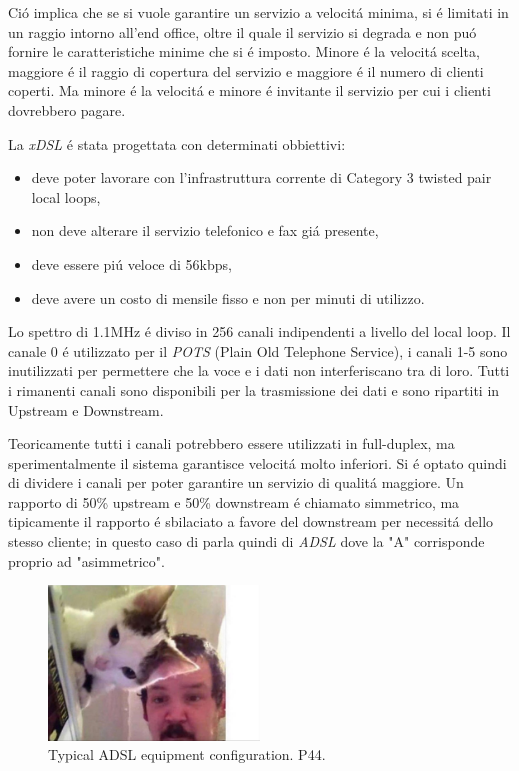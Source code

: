 \documentclass[../ComputerNetworks.tex]{subfiles}
\begin{document}
Ció implica che se si vuole garantire un servizio a velocitá minima, si é limitati in un raggio intorno all’end office, oltre il quale il servizio si degrada e non puó fornire le caratteristiche minime che si é imposto.
Minore é la velocitá scelta, maggiore é il raggio di copertura del servizio e maggiore é il numero di clienti coperti.
Ma minore é la velocitá e minore é invitante il servizio per cui i clienti dovrebbero pagare.

La \emph{xDSL} é stata progettata con determinati obbiettivi:
\begin{itemize}
    \item deve poter lavorare con l’infrastruttura corrente di Category 3 twisted pair local loops,
    \item non deve alterare il servizio telefonico e fax giá presente,
    \item deve essere piú veloce di 56kbps,
    \item deve avere un costo di mensile fisso e non per minuti di utilizzo.
\end{itemize}

Lo spettro di 1.1MHz é diviso in 256 canali indipendenti a livello del local loop.
Il canale 0 é utilizzato per il \emph{POTS} (Plain Old Telephone Service), i canali 1-5 sono inutilizzati per permettere che la voce e i dati non interferiscano tra di loro.
Tutti i rimanenti canali sono disponibili per la trasmissione dei dati e sono ripartiti in Upstream e Downstream.

Teoricamente tutti i canali potrebbero essere utilizzati in full-duplex, ma sperimentalmente il sistema garantisce velocitá molto inferiori.
Si é optato quindi di dividere i canali per poter garantire un servizio di qualitá maggiore.
Un rapporto di 50\% upstream e 50\% downstream é chiamato simmetrico, ma tipicamente il rapporto é sbilaciato a favore del downstream per necessitá dello stesso cliente; in questo caso di parla quindi di \emph{ADSL} dove la "A" corrisponde proprio ad "asimmetrico".

\begin{figure}[h]
    \centering
    \includegraphics[width=0.5\textwidth]{img/ADSLeq.jpg}
    \caption{Typical ADSL equipment configuration. P44.}
\end{figure}
\end{document}
